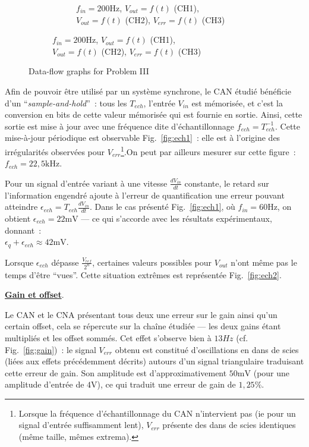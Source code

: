 \documentclass{article}
\begin{document}
\begin{figure}
\begin{subfigure}[b]{0.3\textwidth}
\begin{subfigure}[b]{\textwidth}
			\caption{\centering $f_{in}=\mathrm{200 Hz}$, $V_{out}=f(t)$ (CH1),\\ $V_{out}=f(t)$ (CH2), $V_{err}=f(t)$ (CH3)}
			\label{fig:retard}
		\end{subfigure}
	\end{subfigure}	
	\caption{Data-flow graphs for Problem III}
\end{figure}

Afin de pouvoir être utilisé par un système synchrone, le CAN étudié bénéficie d'un ``\textit{sample-and-hold}''~: tous les $T_{ech}$, l'entrée $V_{in}$ est mémorisée, et c'est la conversion en bits de cette valeur mémorisée qui est fournie en sortie. Ainsi, cette sortie est mise à jour avec une fréquence dite d'échantillonnage $f_{ech} = T_{ech}^{-1}$. Cette mise-à-jour périodique est observable  Fig.~\ref{fig:ech1}~: elle est à l'origine des irrégularités observées pour $V_{err}$\footnote{Lorsque la fréquence d'échantillonnage du CAN n'intervient pas (ie pour un signal d'entrée suffisamment lent), $V_{err}$ présente des dans de scies identiques (même taille, mêmes extrema).}.On peut par ailleurs mesurer sur cette figure~: ${f_{ech} = 22,5\mathrm{kHz}}$.

Pour un signal d'entrée variant à une vitesse $\frac{dV_{in}}{dt}$ constante, le retard sur l'information engendré ajoute à l'erreur de quantification une erreur pouvant atteindre ${\epsilon_{ech} = T_{ech}\frac{dV_{in}}{dt}}$. Dans le cas présenté Fig.~\ref{fig:ech1}, où ${f_{in}=60\mathrm{Hz}}$, on obtient ${\epsilon_{ech} = 22\mathrm{mV}}$ --- ce qui s'accorde avec les résultats expérimentaux, donnant~: \\${\epsilon_q+\epsilon_{ech}\approx 42\mathrm{mV}}$.

Lorsque $\epsilon_{ech}$ dépasse $\frac{V_{ref}}{2^n}$, certaines valeurs possibles pour $V_{out}$ n'ont même pas le temps d'être ``vues''. Cette situation extrêmes est représentée Fig.~\ref{fig:ech2}.


\noindent \textbf{\underline{Gain et offset}}.

Le CAN et le CNA présentant tous deux une erreur sur le gain ainsi qu'un certain offset, cela se répercute sur la chaîne étudiée --- les deux gains étant multipliés et les offset sommés. Cet effet s'observe bien à $13Hz$ (cf. Fig.~\ref{fig:gain})~: le signal $V_{err}$ obtenu est constitué d'oscillations en dans de scies (liées aux effets précédemment décrits) autours d'un signal triangulaire traduisant cette erreur de gain. Son amplitude est d'approximativement $50\mathrm{mV}$ (pour une amplitude d'entrée de $4\mathrm{V}$), ce qui traduit une erreur de gain de $1,25\%$.
\end{document}
